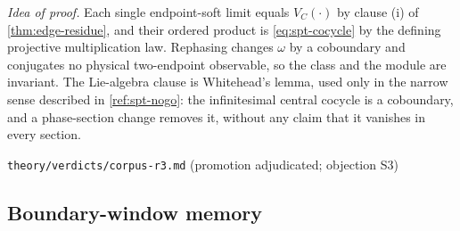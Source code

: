 \emph{Idea of proof.} Each single endpoint-soft limit equals $V_C(\cdot)$ by
clause (i) of \cref{thm:edge-residue}, and their ordered product is
\eqref{eq:spt-cocycle} by the defining projective multiplication law.
Rephasing changes $\omega$ by a coboundary and conjugates no physical
two-endpoint observable, so the class and the module are invariant. The
Lie-algebra clause is Whitehead's lemma, used only in the narrow sense
described in \cref{ref:spt-nogo}: the infinitesimal central cocycle is a
coboundary, and a phase-section change removes it, without any claim that it
vanishes in every section.

%
{\texttt{theory/verdicts/corpus-r3.md} (promotion adjudicated; objection S3)}

\subsection{Boundary-window memory}

